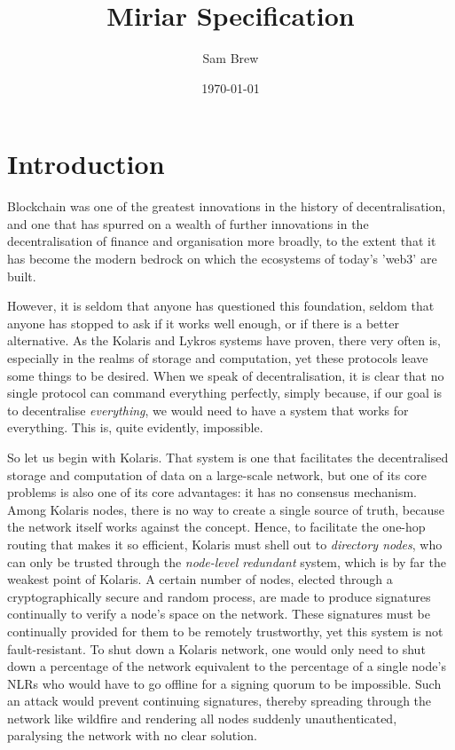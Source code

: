 \documentclass{extreport}
\author{Sam Brew}
\date{\today}
\title{Miriar Specification}
\begin{document}
\maketitle
\tableofcontents
\vspace*{\fill}
\doclicenseThis


\part{Introduction}
\label{sec:org14ec0e7}

Blockchain was one of the greatest innovations in the history of decentralisation, and one that has spurred on a wealth of further innovations in the decentralisation of finance and organisation more broadly, to the extent that it has become the modern bedrock on which the ecosystems of today's 'web3' are built.

However, it is seldom that anyone has questioned this foundation, seldom that anyone has stopped to ask if it works well enough, or if there is a better alternative. As the Kolaris and Lykros systems have proven, there very often is, especially in the realms of storage and computation, yet these protocols leave some things to be desired. When we speak of decentralisation, it is clear that no single protocol can command everything perfectly, simply because, if our goal is to decentralise \emph{everything}, we would need to have a system that works for everything. This is, quite evidently, impossible.

So let us begin with Kolaris. That system is one that facilitates the decentralised storage and computation of data on a large-scale network, but one of its core problems is also one of its core advantages: it has no consensus mechanism. Among Kolaris nodes, there is no way to create a single source of truth, because the network itself works against the concept. Hence, to facilitate the one-hop routing that makes it so efficient, Kolaris must shell out to \emph{directory nodes}, who can only be trusted through the \emph{node-level redundant} system, which is by far the weakest point of Kolaris. A certain number of nodes, elected through a cryptographically secure and random process, are made to produce signatures continually to verify a node's space on the network. These signatures must be continually provided for them to be remotely trustworthy, yet this system is not fault-resistant. To shut down a Kolaris network, one would only need to shut down a percentage of the network equivalent to the percentage of a single node's NLRs who would have to go offline for a signing quorum to be impossible. Such an attack would prevent continuing signatures, thereby spreading through the network like wildfire and rendering all nodes suddenly unauthenticated, paralysing the network with no clear solution.
\end{document}
